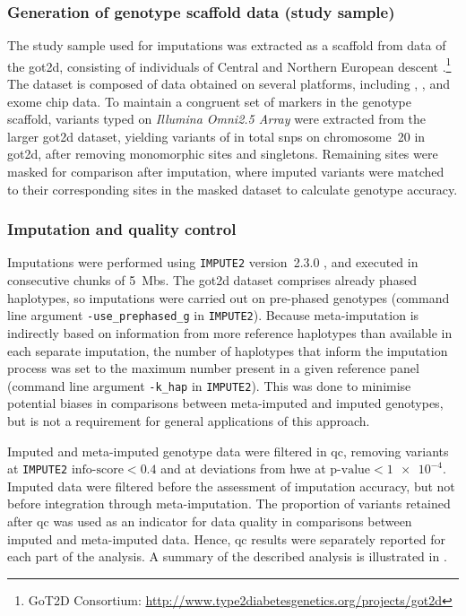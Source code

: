 %
\subsubsection{Generation of genotype scaffold data (study sample)}
%

The study sample used for imputations was extracted as a scaffold from data of the \gls{got2d}, consisting of  individuals of Central and Northern European descent \citep{Fuchsberger:2016df}.\footnote{GoT2D Consortium: \url{http://www.type2diabetesgenetics.org/projects/got2d} }
The dataset is composed of data obtained on several platforms, including , , and exome chip data.
To maintain a congruent set of markers in the genotype scaffold, variants typed on \emph{Illumina Omni2.5 Array} were extracted from the larger \gls{got2d} dataset, yielding  variants of in total  \glspl{snp} on chromosome~20 in \gls{got2d}, after removing monomorphic sites and singletons.
Remaining sites were masked for comparison after imputation, where imputed variants were matched to their corresponding sites in the masked dataset to calculate genotype accuracy.


%
\subsubsection{Imputation and quality control}
\label{sec:meta_methods_imp}
%

Imputations were performed using \texttt{IMPUTE2} version~2.3.0 \citep{Howie:2009hq}, and executed in consecutive chunks of 5~\glspl{Mb}.
The \gls{got2d} dataset comprises already phased haplotypes, so imputations were carried out on pre-phased genotypes (command line argument \verb|-use_prephased_g| in \texttt{IMPUTE2}).
Because meta-imputation is indirectly based on information from more reference haplotypes than available in each separate imputation, the number of haplotypes that inform the imputation process was set to the maximum number present in a given reference panel (command line argument \verb|-k_hap| in \texttt{IMPUTE2}).
This was done to minimise potential biases in comparisons between meta-imputed and imputed genotypes, but is not a requirement for general applications of this approach.

%

%

Imputed and meta-imputed genotype data were filtered in \gls{qc}, removing variants at \texttt{IMPUTE2} ${\mbox{info-score}<0.4}$ and at deviations from \gls{hwe} at ${\mbox{p-value}<\num{1e-4}}$.
Imputed data were filtered before the assessment of imputation accuracy, but not before integration through meta-imputation.
The proportion of variants retained after \gls{qc} was used as an indicator for data quality in comparisons between imputed and meta-imputed data.
Hence, \gls{qc} results were separately reported for each part of the analysis.
A summary of the described analysis is illustrated in .



